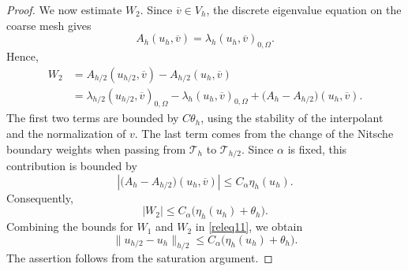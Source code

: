 \documentclass[10pt,a4paper]{amsart}
\begin{document}
\begin{proof}
We now estimate $W_2$. Since $\overline{v}\in V_h$, the discrete eigenvalue equation
on the coarse mesh gives
\[
   A_h(u_h,\overline{v}) = \lambda_h(u_h,\overline{v})_{0,\Omega}.
\]
Hence,
\begin{align*}
W_2 &= A_{h/2}(u_{h/2},\overline{v}) - A_{h/2}(u_h,\overline{v}) \\
&=\lambda_{h/2}(u_{h/2},\overline{v})_{0,\Omega} - \lambda_h(u_h,\overline{v})_{0,\Omega} + \big(A_h-A_{h/2}\big)(u_h,\overline{v}).
\end{align*}
The first two terms are bounded by $C\theta_h$, using the stability of the interpolant
and the normalization of $v$. The last term comes from the change of the Nitsche boundary
weights when passing from $\mathcal T_h$ to $\mathcal T_{h/2}$. Since $\alpha$ is fixed,
this contribution is bounded by
\[
   \left|\big(A_h-A_{h/2}\big)(u_h,\overline{v})\right| \leq  C_\alpha \eta_h(u_h).
\]
Consequently,
\[
   |W_2| \leq C_\alpha\big(\eta_h(u_h)+\theta_h\big).
\]
Combining the bounds for $W_1$ and $W_2$ in \eqref{releq11}, we obtain
\[
   \|u_{h/2}-u_h\|_{h/2} \leq C_\alpha\big(\eta_h(u_h)+\theta_h\big).
\]
The assertion follows from the saturation argument.
\end{proof}
\end{document}
